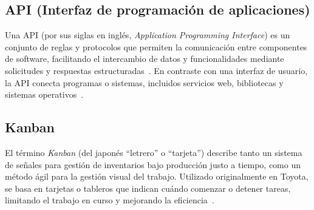 \documentclass[12pt]{article}
\begin{document}
	\subsection*{API (Interfaz de programación de aplicaciones)}
	\hspace{1.27cm}Una API (por sus siglas en inglés, \emph{Application Programming Interface}) es un conjunto de reglas y protocolos que permiten la comunicación entre componentes de software, facilitando el intercambio de datos y funcionalidades mediante solicitudes y respuestas estructuradas \parencite{aws_api,oracle_api}. En contraste con una interfaz de usuario, la API conecta programas o sistemas, incluidos servicios web, bibliotecas y sistemas operativos \parencite{wikipedia_api}.

	\subsection*{Kanban}
	\hspace{1.27cm}El término \emph{Kanban} (del japonés “letrero” o “tarjeta”) describe tanto un sistema de señales para gestión de inventarios bajo producción justo a tiempo, como un método ágil para la gestión visual del trabajo. Utilizado originalmente en Toyota, se basa en tarjetas o tableros que indican cuándo comenzar o detener tareas, limitando el trabajo en curso y mejorando la eficiencia \parencite{wikipedia_kanban_dev,asana_kanban}.
\end{document}
